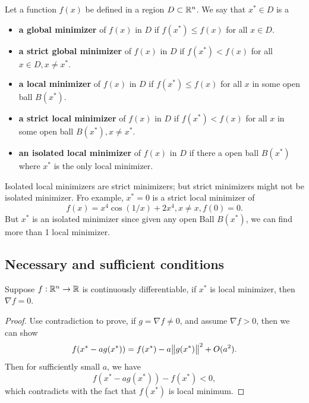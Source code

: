 \begin{refsection}
\begin{definition}
Let a function $f(x)$ be defined in a region $D\subset \mathbb{R}^n$. We say that $x^*\in D$ is a 
\begin{itemize}
	\item \textbf{a global minimizer} of $f(x)$ in $D$ if $f(x^*)\leq f(x)$ for all $x\in D$.
	\item \textbf{a strict global minimizer} of $f(x)$ in $D$ if $f(x^*)< f(x)$ for all $x\in D,x\neq x^*$.
	\item \textbf{a local minimizer} of $f(x)$ in $D$ if $f(x^*)\leq f(x)$ for all $x$ in some open ball $B(x^*)$.
	\item 	\textbf{a strict local minimizer} of $f(x)$ in $D$ if $f(x^*)< f(x)$ for all $x$ in some open ball $B(x^*), x\neq x^*$.
	\item 	\textbf{an isolated local minimizer} of $f(x)$ in $D$ if there a open ball $B(x^*)$ where $x^*$ is the only local minimizer.	
\end{itemize}
\end{definition}

\begin{remark}
Isolated local minimizers are strict minimizers; but strict minimizers might not be isolated minimizer. Fro example, $x^* = 0$ is a strict local minimizer of 
$$f(x) = x^4\cos(1/x) + 2x^4,x\neq x,f(0) = 0.$$
But $x^*$ is an isolated minimizer since given any open Ball $B(x^*)$, we can find more than 1 local minimizer.
\end{remark}


\subsection{Necessary and sufficient conditions}
\begin{theorem} 
Suppose $f:\mathbb{R}^n\rightarrow \mathbb{R}$ is continuously differentiable, if $x^*$ is local minimizer, then $\nabla f = 0$. 
\end{theorem}
\begin{proof}
Use contradiction to prove, if $g = \nabla f \neq 0 $, and assume $\nabla f > 0$, then we can show $$f(x^* - a g(x^*)) = f(x^*) - a\norm{g(x^*)}^2 + O(a^2).$$ 
Then for sufficiently small $a$, we have
$$f(x^* - a g(x^*)) - f(x^*) < 0,$$
which contradicts with the fact that $f(x^*)$ is local minimum.
\end{proof}



\end{refsection}
